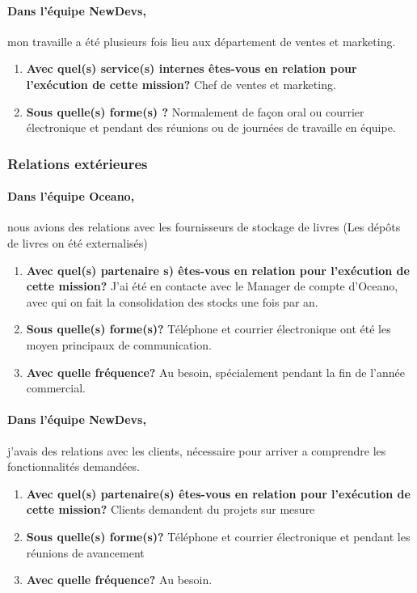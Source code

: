 \documentclass{resume} %
\begin{document}
		\paragraph{Dans l'équipe NewDevs,} mon travaille a été plusieurs fois lieu aux département de ventes et marketing. 
		
		\begin{enumerate}
		\item \textbf{Avec quel(s) service(s) internes êtes-vous en relation pour l'exécution de cette mission?}
			Chef de ventes et marketing. 
		\item \textbf{Sous quelle(s) forme(s) ?}
			Normalement de façon oral ou courrier électronique et pendant des réunions ou de journées de travaille en équipe.
		\end{enumerate}


	
	\subsubsection{Relations extérieures} 
		\paragraph{Dans l'équipe Oceano,} nous avions des relations avec les fournisseurs de stockage de livres (Les dépôts de livres on été externalisés)
		\begin{enumerate}
		\item \textbf{Avec quel(s) partenaire s) êtes-vous en relation pour l'exécution de cette mission?}
			J'ai été en contacte avec le Manager de compte d'Oceano, avec qui on fait la consolidation des stocks une fois par an.
		\item \textbf{Sous quelle(s) forme(s)?}
			Téléphone et courrier électronique ont été les moyen principaux de communication. 
		\item \textbf{Avec quelle fréquence?}
			Au besoin, spécialement pendant la fin de l'année commercial.
		\end {enumerate}			
		
		\paragraph{Dans l'équipe NewDevs,} j'avais des relations avec les clients, nécessaire pour arriver a comprendre les fonctionnalités demandées.   
		\begin{enumerate}
		\item \textbf{Avec quel(s) partenaire(s) êtes-vous en relation pour l'exécution de cette mission?}
			Clients demandent du projets sur mesure 
		\item \textbf{ Sous quelle(s) forme(s)?}
			Téléphone et courrier électronique et pendant les réunions de avancement 
		\item \textbf{Avec quelle fréquence?}
			Au besoin. 
		\end {enumerate}			
		
\end{document}
